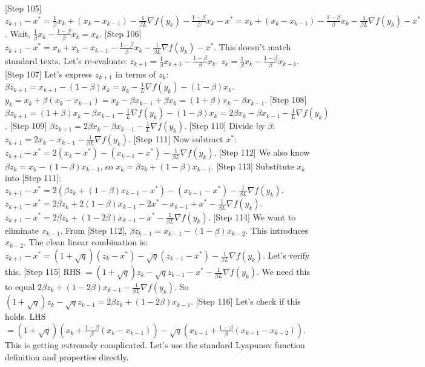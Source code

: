 \documentclass{article}
\begin{document}
[Step 105] $z_{k+1} - x^* = \frac{1}{\beta}x_k + (x_k - x_{k-1}) - \frac{1}{\beta L}\nabla f(y_k) - \frac{1-\beta}{\beta}x_k - x^* = x_k + (x_k - x_{k-1}) - \frac{1-\beta}{\beta}x_k - \frac{1}{\beta L}\nabla f(y_k) - x^*$.
Wait, $\frac{1}{\beta}x_k - \frac{1-\beta}{\beta}x_k = x_k$.
[Step 106] $z_{k+1} - x^* = x_k + x_k - x_{k-1} - \frac{1-\beta}{\beta}x_k - \frac{1}{\beta L}\nabla f(y_k) - x^*$.
This doesn't match standard texts. Let's re-evaluate:
$z_{k+1} = \frac{1}{\beta}x_{k+1} - \frac{1-\beta}{\beta}x_k$.
$z_k = \frac{1}{\beta}x_k - \frac{1-\beta}{\beta}x_{k-1}$.
[Step 107] Let's express $z_{k+1}$ in terms of $z_k$:
$\beta z_{k+1} = x_{k+1} - (1-\beta)x_k = y_k - \frac{1}{L}\nabla f(y_k) - (1-\beta)x_k$.
$y_k = x_k + \beta(x_k - x_{k-1}) = x_k - \beta x_{k-1} + \beta x_k = (1+\beta)x_k - \beta x_{k-1}$.
[Step 108] $\beta z_{k+1} = (1+\beta)x_k - \beta x_{k-1} - \frac{1}{L}\nabla f(y_k) - (1-\beta)x_k = 2\beta x_k - \beta x_{k-1} - \frac{1}{L}\nabla f(y_k)$.
[Step 109] $\beta z_{k+1} = 2\beta x_k - \beta x_{k-1} - \frac{1}{L}\nabla f(y_k)$.
[Step 110] Divide by $\beta$: $z_{k+1} = 2x_k - x_{k-1} - \frac{1}{\beta L}\nabla f(y_k)$.
[Step 111] Now subtract $x^*$: $z_{k+1} - x^* = 2(x_k - x^*) - (x_{k-1} - x^*) - \frac{1}{\beta L}\nabla f(y_k)$.
[Step 112] We also know $\beta z_k = x_k - (1-\beta)x_{k-1}$, so $x_k = \beta z_k + (1-\beta)x_{k-1}$.
[Step 113] Substitute $x_k$ into [Step 111]:
$z_{k+1} - x^* = 2(\beta z_k + (1-\beta)x_{k-1} - x^*) - (x_{k-1} - x^*) - \frac{1}{\beta L}\nabla f(y_k)$.
$z_{k+1} - x^* = 2\beta z_k + 2(1-\beta)x_{k-1} - 2x^* - x_{k-1} + x^* - \frac{1}{\beta L}\nabla f(y_k)$.
$z_{k+1} - x^* = 2\beta z_k + (1-2\beta)x_{k-1} - x^* - \frac{1}{\beta L}\nabla f(y_k)$.
[Step 114] We want to eliminate $x_{k-1}$. From [Step 112], $\beta z_{k-1} = x_{k-1} - (1-\beta)x_{k-2}$.
This introduces $x_{k-2}$. The clean linear combination is:
$z_{k+1} - x^* = (1+\sqrt{q})(z_k - x^*) - \sqrt{q}(z_{k-1} - x^*) - \frac{1}{\beta L}\nabla f(y_k)$.
Let's verify this.
[Step 115] RHS $= (1+\sqrt{q})z_k - \sqrt{q}z_{k-1} - x^* - \frac{1}{\beta L}\nabla f(y_k)$.
We need this to equal $2\beta z_k + (1-2\beta)x_{k-1} - \frac{1}{\beta L}\nabla f(y_k)$.
So $(1+\sqrt{q})z_k - \sqrt{q}z_{k-1} = 2\beta z_k + (1-2\beta)x_{k-1}$.
[Step 116] Let's check if this holds.
LHS $= (1+\sqrt{q})(x_k + \frac{1-\beta}{\beta}(x_k - x_{k-1})) - \sqrt{q}(x_{k-1} + \frac{1-\beta}{\beta}(x_{k-1} - x_{k-2}))$.
This is getting extremely complicated. Let's use the standard Lyapunov function definition and properties directly.
\end{document}
